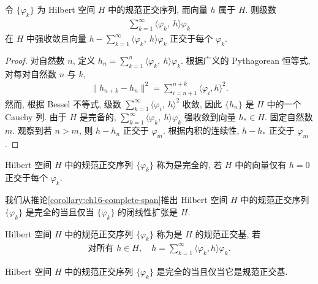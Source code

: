\documentclass[../../main.tex]{subfiles}
\begin{document}
\begin{proposition}\label{proposition:ch16-fourier-series}
令 $\{\varphi_{k}\}$ 为 Hilbert 空间 $H$ 中的规范正交序列, 而向量 $h$ 属于 $H$. 则级数
\begin{align*}
\sum_{k=1}^{\infty}\langle\varphi_{k},\ h\rangle\varphi_{k}
\end{align*}
在 $H$ 中强收敛且向量 $h-\sum_{k=1}^{\infty}\langle\varphi_{k},\ h\rangle\varphi_{k}$ 正交于每个 $\varphi_{k}$.
\end{proposition}

\begin{proof}
对自然数 $n$, 定义 $h_{n}=\sum_{k=1}^{n}\langle\varphi_{k},\ h\rangle\varphi_{k}$. 根据广义的 Pythagorean 恒等式, 对每对自然数 $n$ 与 $k$,
\begin{align*}
\|h_{n+k}-h_{n}\|^{2}=\sum_{i=n+1}^{n+k}\langle\varphi_{i},h\rangle^{2}.
\end{align*}
然而, 根据 Bessel 不等式, 级数 $\sum_{k=1}^{\infty}\langle\varphi_{i},\ h\rangle^{2}$ 收敛, 因此 $\{h_{n}\}$ 是 $H$ 中的一个 Cauchy 列. 由于 $H$ 是完备的, $\sum_{k=1}^{\infty}\langle\varphi_{k},\ h\rangle\varphi_{k}$ 强收敛到向量 $h_{*}\in H$. 固定自然数 $m$. 观察到若 $n>m$, 则 $h-h_{n}$ 正交于 $\varphi_{m}$. 根据内积的连续性, $h-h_{*}$ 正交于 $\varphi_{m}$.
\end{proof}

\begin{definition}[完全规范正交序列]\label{definition:ch16-complete-ono}
Hilbert 空间 $H$ 中的规范正交序列 $\{\varphi_{k}\}$ 称为是完全的, 若 $H$ 中的向量仅有 $h=0$ 正交于每个 $\varphi_{k}$.
\end{definition}

我们从推论\cref{corollary:ch16-complete-span}推出 Hilbert 空间 $H$ 中的规范正交序列 $\{\varphi_{k}\}$ 是完全的当且仅当 $\{\varphi_{k}\}$ 的闭线性扩张是 $H$.

\begin{definition}[规范正交基]\label{definition:ch16-ono-basis}
Hilbert 空间 $H$ 中的规范正交序列 $\{\varphi_{k}\}$ 称为是 $H$ 的规范正交基, 若
\begin{align}
\text{对所有 }h\in H,\quad h=\sum_{k=1}^{\infty}\langle\varphi_{k},h\rangle\varphi_{k}.\label{align:ch16-fourier}
\end{align}
\end{definition}

\begin{proposition}\label{proposition:ch16-complete-iff-basis}
Hilbert 空间 $H$ 中的规范正交序列 $\{\varphi_{k}\}$ 是完全的当且仅当它是规范正交基.
\end{proposition}
\end{document}

